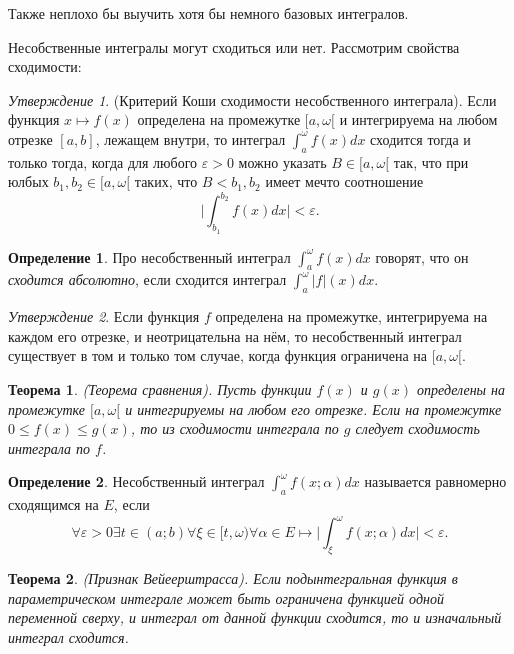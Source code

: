 \documentclass[a4paper,100pt]{article}
\theoremstyle{indented}
\newtheorem{theorem}{Теорема}
\theoremstyle{definition}
\newtheorem{defn}{Определение}
\theoremstyle{remark}
\newtheorem{stat}{Утверждение}
\begin{document}
Также неплохо бы выучить хотя бы немного базовых интегралов. \ 

Несобственные интегралы могут сходиться или нет. Рассмотрим свойства сходимости: \ 

\begin{stat}
    (Критерий Коши сходимости несобственного интеграла). Если функция $x\mapsto f(x)$ определена на промежутке $[a, \omega[$ и интегрируема на любом отрезке $[a, b]$, лежащем внутри, то интеграл $\int_a^\omega f(x)dx$ сходится тогда и только тогда, когда для любого $\varepsilon>0$ можно указать $B\in [a, \omega[$ так, что при юлбых $b_1, b_2\in [a, \omega[$ таких, что $B<b_1, b_2$ имеет мечто соотношение 
    \[
        \bigg| \int_{b_1}^{b_2}f(x)dx\bigg| < \varepsilon. 
    \]
\end{stat}

\begin{defn}
    Про несобственный интеграл $\int_a^\omega f(x)dx$ говорят, что он \textit{сходится абсолютно}, если сходится интеграл $\int_a^\omega |f|(x)dx$. 
\end{defn}

\begin{stat}
    Если функция $f$ определена на промежутке, интегрируема на каждом его отрезке, и неотрицательна на нём, то несобственный интеграл существует в том и только том случае, когда функция ограничена на $[a, \omega[$. 
\end{stat}

\begin{theorem}
    (Теорема сравнения). Пусть функции $f(x)$ и $g(x)$ определены на промежутке $[a, \omega[$ и интегрируемы на любом его отрезке. Если на промежутке $0\leq f(x) \leq g(x)$, то из сходимости интеграла по $g$ следует сходимость интеграла по $f$. 
\end{theorem}

\begin{defn}
    Несобственный интеграл $\int_a^\omega f(x;\alpha)dx$ называется равномерно сходящимся на $E$, если 
    \[
        \forall \varepsilon>0 \exists t\in(a;b) \forall \xi \in [t, \omega) \forall \alpha \in E \mapsto \bigg| \int_\xi^\omega f(x;\alpha)dx \bigg|<\varepsilon.
    \]
\end{defn}

\begin{theorem}
    (Признак Вейеерштрасса). Если подынтегральная функция в параметрическом интеграле может быть ограничена функцией одной переменной сверху, и интеграл от данной функции сходится, то и изначальный интеграл сходится.
\end{theorem} \
\end{document}
